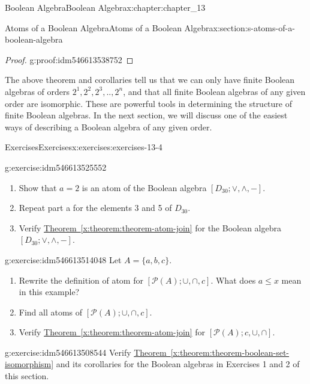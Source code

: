 \documentclass[oneside,10pt,]{book}
\newcommand{\xreffont}{\relax}
\numberwithin{equation}{section}
\begin{document}
\begin{chapterptx}{Boolean Algebra}{}{Boolean Algebra}{}{}{x:chapter:chapter_13}
\begin{sectionptx}{Atoms of a Boolean Algebra}{}{Atoms of a Boolean Algebra}{}{}{x:section:s-atoms-of-a-boolean-algebra}
\begin{proof}{}{g:proof:idm546613538752}
\end{proof}
The above theorem and corollaries tell us that we can only have finite Boolean algebras of orders \(2^1, 2^2, 2^3,. . , 2^n\), and that all finite Boolean algebras of any given order are isomorphic. These are powerful tools in determining the structure of finite Boolean algebras. In the next section, we will discuss one of the easiest ways of describing a Boolean algebra of any given order.%
%
%
\typeout{************************************************}
\typeout{************************************************}
%
\begin{exercises-subsection}{Exercises}{}{Exercises}{}{}{x:exercises:exercises-13-4}
\begin{divisionexercise}{1}{}{}{g:exercise:idm546613525552}%
%
\begin{enumerate}[label=(\alph*)]
\item{}Show that \(a = 2\) is an atom of the Boolean algebra \(\left[D_{30}; \lor , \land, - \right]\).%
\item{}Repeat part a for the elements 3 and 5 of \(D_{30}\).%
\item{}Verify \hyperref[x:theorem:theorem-atom-join]{Theorem~{\xreffont\ref{x:theorem:theorem-atom-join}}} for the Boolean algebra \(\left[D_{30}; \lor , \land, - \right]\).%
\end{enumerate}
%
\end{divisionexercise}%
\begin{divisionexercise}{2}{}{}{g:exercise:idm546613514048}%
Let \(A = \{a, b, c\}\).%
\begin{enumerate}[label=(\alph*)]
\item{}Rewrite the definition of atom for \([\mathcal{P}(A); \cup , \cap, c ]\). What does \(a \leq  x\) mean in this example?%
\item{}Find all atoms of \([\mathcal{P}(A); \cup , \cap, c ]\).%
\item{}Verify \hyperref[x:theorem:theorem-atom-join]{Theorem~{\xreffont\ref{x:theorem:theorem-atom-join}}} for \([\mathcal{P}(A); c, \cup , \cap ]\).%
\end{enumerate}
%
\end{divisionexercise}%
\begin{divisionexercise}{3}{}{}{g:exercise:idm546613508544}%
Verify \hyperref[x:theorem:theorem-boolean-set-isomorphism]{Theorem~{\xreffont\ref{x:theorem:theorem-boolean-set-isomorphism}}} and its corollaries for the Boolean algebras in Exercises 1 and 2 of this section.%
\end{divisionexercise}%

\end{exercises-subsection}
\end{sectionptx}
\end{chapterptx}
\end{document}
